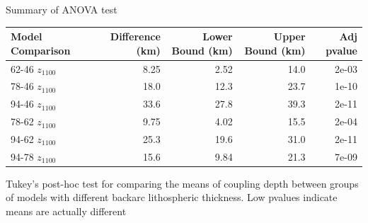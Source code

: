 \documentclass{article}
\begin{document}
	\begin{threeparttable}
		\captionsetup{labelformat=empty}
		\caption{Summary of ANOVA test}
		\setlength{\tabcolsep}{4pt}
		\begin{tabularx}{\textwidth}{L{1} R{1} R{1} R{1} R{1}}
			
			\toprule
			
			Model Comparison & Difference (km) & Lower Bound (km) & Upper Bound (km) & Adj pvalue \\
			
			\midrule
			
			62-46 $z_{1100}$ & 8.25 & 2.52 & 14.0 & 2e-03 \\
			78-46 $z_{1100}$ & 18.0 & 12.3 & 23.7 & 1e-10 \\
			94-46 $z_{1100}$ & 33.6 & 27.8 & 39.3 & 2e-11 \\
			78-62 $z_{1100}$ & 9.75 & 4.02 & 15.5 & 2e-04 \\
			94-62 $z_{1100}$ & 25.3 & 19.6 & 31.0 & 2e-11 \\
			94-78 $z_{1100}$ & 15.6 & 9.84 & 21.3 & 7e-09 \\
			
			\bottomrule

\end{tabularx}
\begin{tablenotes}
\item Tukey's post-hoc test for comparing the means of coupling depth between groups
of models with different backarc lithospheric thickness. Low pvalues indicate means
are actually different
\end{tablenotes}
\end{threeparttable}
\end{document}
